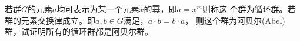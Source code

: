 若群$G$的元素$a$均可表示为某一个元素$x$的幂，即$a=x^m$则称这
个群为循环群。若群的元素交换律成立。即$a,b\in G$满足，$a\cdot b=b\cdot a$，
则这个群为阿贝尔(Abel)群，试证明所有的循环群都是阿贝尔群。
